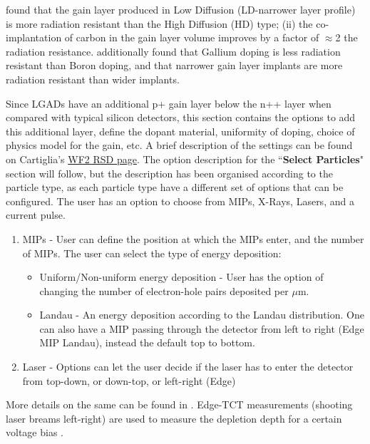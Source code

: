 \documentclass[11pt]{article}
\begin{document}
\cite{arcidiacono-irradiation} found that the gain layer produced in Low Diffusion (LD-narrower layer profile) is more radiation resistant than the High Diffusion (HD) type; (ii) the co-implantation of carbon in the gain layer volume improves by a factor of $\approx$2 the radiation resistance. \cite{ferrero-radiation-hardness} additionally found that Gallium doping is less radiation resistant than Boron doping, and that narrower gain layer implants are more radiation resistant than wider implants.

Since LGADs have an additional p+ gain layer below the n++ layer when compared with typical silicon detectors, this section contains the options to add this additional layer, define the dopant material, uniformity of doping, choice of physics model for the gain, etc. A brief description of the settings can be found on Cartiglia's \href{http://personalpages.to.infn.it/~cartigli/Weightfield2/Manual_2.html}{WF2 RSD page}.
\newline
The option description for the ``\textbf{Select Particles}" section will follow, but the description has been organised according to the particle type, as each particle type have a different set of options that can be configured. The user has an option to choose from MIPs, X-Rays, Lasers, and a current pulse.
\begin{enumerate}
    \item MIPs - User can define the position at which the MIPs enter, and the number of MIPs. The user can select the type of energy deposition:
    \begin{itemize}
        \item Uniform/Non-uniform energy deposition - User has the option of changing the number of electron-hole pairs deposited per $\mu$m.
        \item Landau - An energy deposition according to the Landau distribution. One can also have a MIP passing through the detector from left to right (Edge MIP Landau), instead the default top to bottom.
    \end{itemize}
    \item Laser - Options can let the user decide if the laser has to enter the detector from top-down, or down-top, or left-right (Edge)
\end{enumerate}
More details on the same can be found in \cite{WF2-incident-particles-cenna}.
\newline
Edge-TCT measurements (shooting laser breams left-right) are used to measure the depletion depth for a certain voltage bias \cite{moll-acceptor-removal}.
\end{document}
